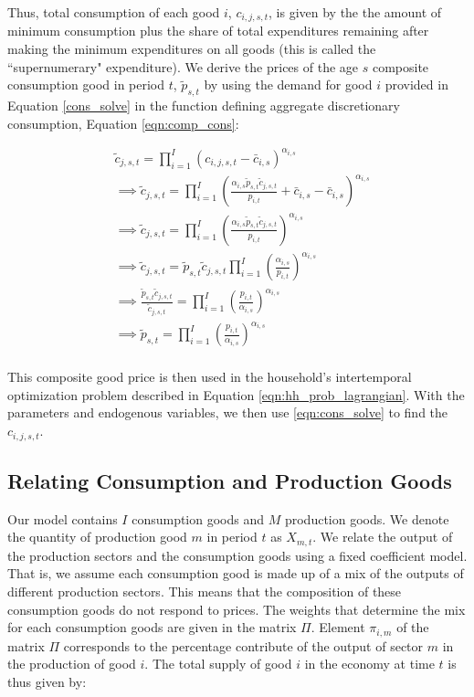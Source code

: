     Thus, total consumption of each good $i$, $c_{i,j,s,t}$, is given by the the amount of minimum consumption plus the share of total expenditures remaining after making the minimum expenditures on all goods (this is called the ``supernumerary" expenditure).  We derive the prices of the age $s$ composite consumption good in period $t$, $\tilde{p}_{s,t}$ by using the demand for good $i$ provided in Equation \ref{cons_solve} in the function defining aggregate discretionary consumption, Equation \ref{eqn:comp_cons}: 
    
              \begin{equation} \label{eqn:composite_price}
      \begin{split}
      & \tilde{c}_{j,s,t} = \prod_{i=1}^{I}(c_{i,j,s,t}-\bar{c}_{i,s})^{\alpha_{i,s}} \\
      &\implies \tilde{c}_{j,s,t} = \prod_{i=1}^{I}\left( \frac{\alpha_{i,s} \tilde{p}_{s,t}\tilde{c}_{j,s,t}}{p_{i,t}} + \bar{c}_{i,s}-\bar{c}_{i,s}\right)^{\alpha_{i,s}} \\
      &\implies \tilde{c}_{j,s,t} = \prod_{i=1}^{I} \left( \frac{\alpha_{i,s} \tilde{p}_{s,t}\tilde{c}_{j,s,t}}{p_{i,t}} \right)^{\alpha_{i,s}} \\
      &\implies \tilde{c}_{j,s,t} =  \tilde{p}_{s,t}\tilde{c}_{j,s,t} \prod_{i=1}^{I}\left( \frac{\alpha_{i,s}}{p_{i,t}} \right)^{\alpha_{i,s}} \\
      &\implies \frac{\tilde{p}_{s,t}\tilde{c}_{j,s,t}}{\tilde{c}_{j,s,t}} =  \prod_{i=1}^{I}\left( \frac{p_{i,t}}{\alpha_{i,s}} \right)^{\alpha_{i,s}} \\
       &\implies \tilde{p}_{s,t} =  \prod_{i=1}^{I}\left( \frac{p_{i,t}}{\alpha_{i,s}} \right)^{\alpha_{i,s}} \\
       \end{split}
    \end{equation}
    
    This composite good price is then used in the household's intertemporal optimization problem described in Equation \ref{eqn:hh_prob_lagrangian}.  With the parameters and endogenous variables, we then use \ref{eqn:cons_solve} to find the $c_{i,j,s,t}$.
    
    \subsection{Relating Consumption and Production Goods}\label{sec:prod_cons_map}
    
    Our model contains $I$ consumption goods and $M$ production goods.  We denote the quantity of production good $m$ in period $t$ as $X_{m,t}$.  We relate the output of the production sectors and the consumption goods using a fixed coefficient model. That is, we assume each consumption good is made up of a mix of the outputs of different production sectors.  This means that the composition of these consumption goods do not respond to prices. The weights that determine the mix for each consumption goods are given in the matrix $\Pi$.  Element $\pi_{i,m}$ of the matrix $\Pi$ corresponds to the percentage contribute of the output of sector $m$ in the production of good $i$.  The total supply of good $i$ in the economy at time $t$ is thus given by: 
    
